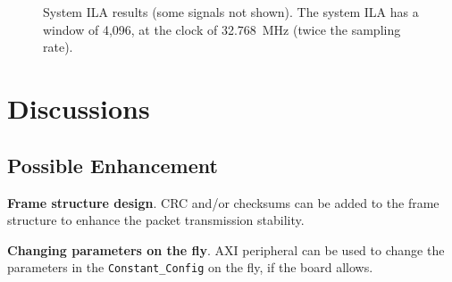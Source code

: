 \documentclass[journal,twoside]{IEEEtran}
\begin{document}
    \begin{figure}
      \setlength{\tabcolsep}{2pt}
      \\
      \\
      \caption{System ILA results (some signals not shown). The system ILA has a window of 4,096, at the clock of \qty{32.768}{MHz} (twice the sampling rate).}
      \label{fig:ila}
    \end{figure}

  \section{Discussions}

    \subsection{Possible Enhancement}

      \textbf{Frame structure design}.
      CRC and/or checksums can be added to the frame structure to enhance the packet transmission stability.

      \textbf{Changing parameters on the fly}.
      AXI peripheral \cite{xilinx:pg127} can be used to change the parameters in the \texttt{Constant\_Config} on the fly,
      if the board allows.
\end{document}

